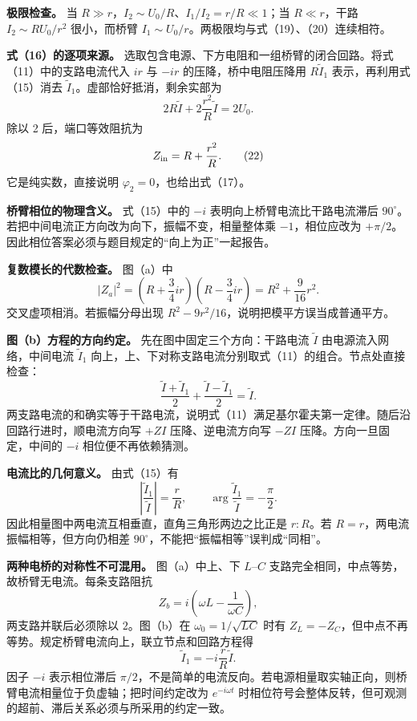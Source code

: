 \documentclass[12pt,a4paper,UTF8]{ctexart}
\begin{document}
\textbf{极限检查。} 当
\(R\gg r\)，\(I_2\sim U_0/R\)、\(I_1/I_2=r/R\ll1\)；当 \(R\ll r\)，干路
\(I_2\sim RU_0/r^2\) 很小，而桥臂
\(I_1\sim U_0/r\)。两极限均与式（19）、（20）连续相符。

\textbf{式（16）的逐项来源。}
选取包含电源、下方电阻和一组桥臂的闭合回路。将式（11）中的支路电流代入
\(ir\) 与 \(-ir\) 的压降，桥中电阻压降用 \(R\widetilde I_1\)
表示，再利用式（15）消去 \(\widetilde I_1\)。虚部恰好抵消，剩余实部为 \[
2R\widetilde I+2\frac{r^2}{R}\widetilde I=2U_0. \tag{21}
\] 除以 2 后，端口等效阻抗为 \[
Z_{\rm in}=R+\frac{r^2}{R}. \tag{22}
\] 它是纯实数，直接说明 \(\varphi_2=0\)，也给出式（17）。

\textbf{桥臂相位的物理含义。} 式（15）中的 \(-i\)
表明向上桥臂电流比干路电流滞后
\(90^\circ\)。若把中间电流正方向改为向下，振幅不变，相量整体乘
\(-1\)，相位应改为
\(+\pi/2\)。因此相位答案必须与题目规定的``向上为正''一起报告。

\textbf{复数模长的代数检查。} 图（a）中 \[
|Z_a|^2=\left(R+\frac34ir\right)
\left(R-\frac34ir\right)
=R^2+\frac9{16}r^2. \tag{23}
\] 交叉虚项相消。若振幅分母出现
\(R^2-9r^2/16\)，说明把模平方误当成普通平方。

\textbf{图（b）方程的方向约定。} 先在图中固定三个方向：干路电流
\(\widetilde I\) 由电源流入网络，中间电流 \(\widetilde I_1\)
向上，上、下对称支路电流分别取式（11）的组合。节点处直接检查： \[
\frac{\widetilde I+\widetilde I_1}{2}
+\frac{\widetilde I-\widetilde I_1}{2}
=\widetilde I. \tag{24}
\]
两支路电流的和确实等于干路电流，说明式（11）满足基尔霍夫第一定律。随后沿回路行进时，顺电流方向写
\(+ZI\) 压降、逆电流方向写 \(-ZI\) 压降。方向一旦固定，中间的 \(-i\)
相位便不再依赖猜测。

\textbf{电流比的几何意义。} 由式（15）有 \[
\left|\frac{\widetilde I_1}{\widetilde I}\right|=\frac rR,
\qquad
\arg\frac{\widetilde I_1}{\widetilde I}=-\frac\pi2. \tag{29}
\] 因此相量图中两电流互相垂直，直角三角形两边之比正是 \(r:R\)。若
\(R=r\)，两电流振幅相等，但方向仍相差
\(90^\circ\)，不能把``振幅相等''误判成``同相''。

\textbf{两种电桥的对称性不可混用。} 图（a）中上、下 \(L\)--\(C\)
支路完全相同，中点等势，故桥臂无电流。每条支路阻抗 \[
Z_b=i\left(\omega L-\frac1{\omega C}\right),
\] 两支路并联后必须除以 \(2\)。图（b）在 \(\omega_0=1/\sqrt{LC}\) 时有
\(Z_L=-Z_C\)，但中点不再等势。规定桥臂电流向上，联立节点和回路方程得 \[
\widetilde I_1=-i\frac rR\widetilde I.
\] 因子 \(-i\) 表示相位滞后
\(\pi/2\)，不是简单的电流反向。若电源相量取实轴正向，则桥臂电流相量位于负虚轴；把时间约定改为
\(e^{-i\omega t}\)
时相位符号会整体反转，但可观测的超前、滞后关系必须与所采用的约定一致。
\end{document}
